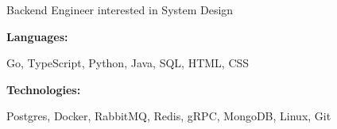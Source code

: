 \documentclass[9pt]{developercv} %
\begin{document}
\begin{minipage}[t]{0.46\textwidth}
	\vspace{-6pt}
Backend Engineer interested in System Design
\end{minipage}
\hfill %
\begin{minipage}[t]{0.465\textwidth}
    \vspace{-6pt}
    
    \begin{minipage}[t]{0.2\textwidth}
        \textbf{Languages:}
    \end{minipage}
    \hfill
    \begin{minipage}[t]{0.73\textwidth}
      Go, TypeScript, Python, Java, SQL, HTML, CSS  
    \end{minipage}
    \vspace{4mm}
    
    \begin{minipage}[t]{0.2\textwidth}
        \textbf{Technologies:}
    \end{minipage}
    \hfill
    \begin{minipage}[t]{0.73\textwidth}
      Postgres, Docker, RabbitMQ, Redis, gRPC, MongoDB, Linux, Git
    \end{minipage}
    
\end{minipage}
\end{document}
